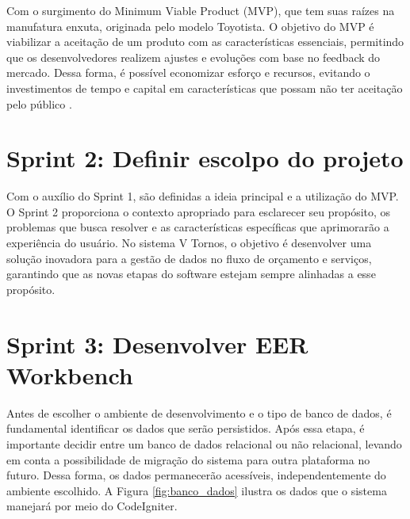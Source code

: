 Com o surgimento do Minimum Viable Product (MVP), que tem suas raízes na manufatura enxuta, originada pelo modelo Toyotista. O objetivo do MVP é viabilizar a aceitação de um produto com as características essenciais, permitindo que os desenvolvedores realizem ajustes e evoluções com base no feedback do mercado. Dessa forma, é possível economizar esforço e recursos, evitando o investimentos de tempo e capital em características que possam não ter aceitação pelo público \mbox{\cite{a:mvp_2023}.}

\section{Sprint 2: Definir escolpo do projeto}
\label{sec:definir_escolpo}

Com o auxílio do Sprint 1, são definidas a ideia principal e a utilização do MVP. O Sprint 2 proporciona o contexto apropriado para esclarecer seu propósito, os problemas que busca resolver e as características específicas que aprimorarão a experiência do usuário. No sistema V Tornos, o objetivo é desenvolver uma solução inovadora para a gestão de dados no fluxo de orçamento e serviços, garantindo que as novas etapas do software estejam sempre alinhadas a esse propósito.

\section{Sprint 3: Desenvolver EER Workbench}
\label{sec:desenvolver_eer}

Antes de escolher o ambiente de desenvolvimento e o tipo de banco de dados, é fundamental identificar os dados que serão persistidos. Após essa etapa, é importante decidir entre um banco de dados relacional ou não relacional, levando em conta a possibilidade de migração do sistema para outra plataforma no futuro. Dessa forma, os dados permanecerão acessíveis, independentemente do ambiente escolhido. A Figura \ref{fig:banco_dados} ilustra os dados que o sistema manejará por meio do CodeIgniter.

